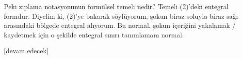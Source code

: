 \documentclass[12pt,fleqn]{article}\usepackage{../../common}
\begin{document}
Peki zıplama notasyonunun formülsel temeli nedir? Temeli (2)'deki entegral
formdur. Diyelim ki, (2)'ye bakarak söylüyorum, şokun biraz soluyla biraz
sağı arasındaki bölgede entegral alıyorum. Bu normal, şokun içeriğini
yakalamak / kaydetmek için o şekilde entegral sınırı tanımlamam normal.

















[devam edecek]
\end{document}
